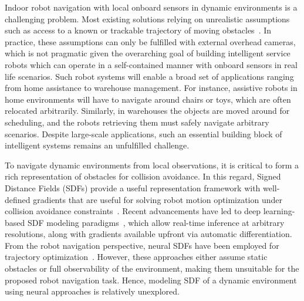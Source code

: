 \documentclass[letterpaper, 10 pt, conference]{ieeeconf}  %
\begin{document}
Indoor robot navigation with local onboard sensors in dynamic environments is a challenging problem.
Most existing solutions relying on unrealistic assumptions such as access to a known or trackable trajectory of moving obstacles~\cite{finean2021predicted}.
In practice, these assumptions can only be fulfilled with external overhead cameras, which is not pragmatic given the overarching goal of building intelligent service robots which can operate in a self-contained manner with onboard sensors in real life scenarios.
Such robot systems will enable a broad set of applications ranging from home assistance to warehouse management.
For instance, assistive robots in home environments will have to navigate around chairs or toys, which are often relocated arbitrarily. 
Similarly, in warehouses the objects are moved around for scheduling, and the robots retrieving them must safely navigate arbitrary scenarios.
Despite large-scale applications, such an essential building block of intelligent systems remains an unfulfilled challenge.

To navigate dynamic environments from local observations, it is critical to form a rich representation of obstacles for collision avoidance.
In this regard, Signed Distance Fields (SDFs) provide a useful representation framework with well-defined gradients that are useful for solving robot motion optimization under collision avoidance constraints~\cite{zucker2013chomp,oleynikova2017voxblox,finean2021predicted}.
Recent advancements have led to deep learning-based SDF modeling paradigms~\cite{deepsdf19,isdf22,gropp2020implicit}, which allow real-time inference at arbitrary resolutions, along with gradients available upfront via automatic differentiation.
From the robot navigation perspective, neural SDFs have been employed for trajectory optimization~\cite{saulnier2020information,hiosdf2023,nfomp2022}.
However, these approaches either assume static obstacles or full observability of the environment, making them unsuitable for the proposed robot navigation task.
Hence, modeling SDF of a dynamic environment using neural approaches is relatively unexplored.
\end{document}
